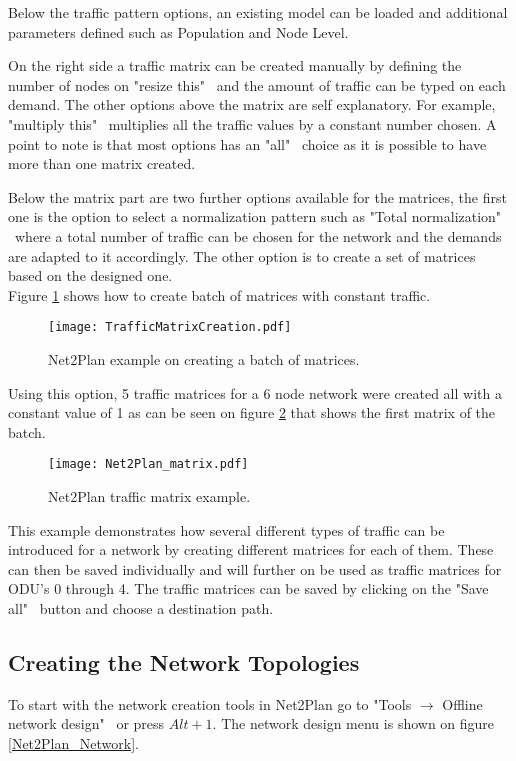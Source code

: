 	Below the traffic pattern options, an existing model can be loaded and additional parameters defined such as Population and Node Level.
	
	On the right side a traffic matrix can be created manually by defining the number of nodes on "resize this" \ and the amount of traffic can be typed on each demand. The other options above the matrix are self explanatory. For example, "multiply this" \ multiplies all the traffic values by a constant number chosen. A point to note is that most options has an "all" \ choice as it is possible to have more than one matrix created.
	
	Below the matrix part are two further options available for the matrices, the first one is the option to select a normalization pattern such as "Total normalization" \ where a total number of traffic can be chosen for the network and the demands are adapted to it accordingly. The other option is to create a set of matrices based on the designed one.\\
	
	Figure \ref{TrafficMatrixCreation} shows how to create batch of matrices with constant traffic.
	
	\begin{figure}[h!]
		\centering
		\texttt{[image: TrafficMatrixCreation.pdf]}
		\caption{Net2Plan example on creating a batch of matrices.}
		\label{TrafficMatrixCreation}
	\end{figure} 	
	
	Using this option, 5 traffic matrices for a 6 node network were created all with a constant value of 1 as can be seen on figure \ref{Net2Plan_matrix} that shows the first matrix of the batch.

	\begin{figure}[h!]
		\centering
		\texttt{[image: Net2Plan\_matrix.pdf]}
		\caption{Net2Plan traffic matrix example.}
		\label{Net2Plan_matrix}
	\end{figure}
	
	This example demonstrates how several different types of traffic can be introduced for a network by creating different matrices for each of them. These can then be saved individually and will further on be used as traffic matrices for ODU's 0 through 4. The traffic matrices can be saved by clicking on the "Save all" \ button and choose a destination path.
	
		
	\subsection*{Creating the Network Topologies} \label{Creating the Network topologies}
	To start with the network creation tools in Net2Plan go to "Tools $\rightarrow$ Offline network design" \ or press $Alt+1$. The network design menu is shown on figure \ref{Net2Plan_Network}.
	
